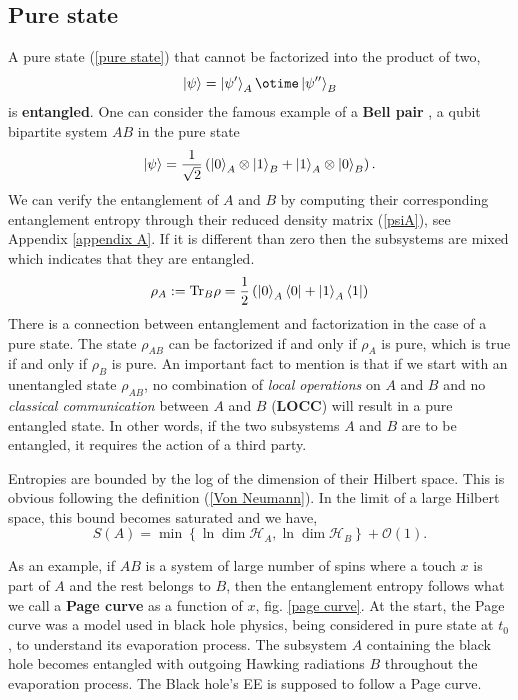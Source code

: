 \subsection{Pure state}
A pure state (\ref{pure state}) that cannot be factorized into the product of two,
\begin{equation}\label{factorized state}
    \ket{\psi} = \ket{\psi'}_A\otime\ket{\psi''}_B
\end{equation}
is \textbf{entangled}. One can consider the famous example of a \textbf{Bell pair} \cite{Bell}, a qubit bipartite system $AB$ in the pure state
\begin{equation}\label{Bell pair}
    \ket{\psi}=\frac{1}{\sqrt{2}}\left(\ket{0}_A\otimes\ket{1}_B+ \ket{1}_A\otimes\ket{0}_B\right).
\end{equation}
We can verify the entanglement of $A$ and $B$ by computing their corresponding entanglement entropy through their reduced density matrix (\ref{psiA}), see Appendix \ref{appendix A}. If it is different than zero then the subsystems are mixed which indicates that they are entangled.
\begin{equation}\label{psiA}
    \rho_A := \text{Tr}_B\rho = \frac{1}{2}\left(\ket{0}_A\bra{0}+\ket{1}_A\bra{1}\right)
\end{equation}
There is a connection between entanglement and factorization in the case of a pure state. The state $\rho_{AB}$ can be factorized if and only if $\rho_A$ is pure, which is true if and only if $\rho_B$ is pure. An important fact to mention is that if we start with an unentangled state $\rho_{AB}$, no combination of \textit{local operations} on $A$ and $B$ and no \textit{classical communication} between $A$ and $B$ (\textbf{LOCC})  will result in a pure entangled state. In other words, if the two subsystems $A$ and $B$ are to be entangled, it requires the action of a third party.

Entropies are bounded by the log of the dimension of their Hilbert space. This is obvious following the definition (\ref{Von Neumann}). In the limit of a large Hilbert space, this bound becomes saturated and we have,
\begin{equation}
    S\left(A\right) = \min \left\{ \ln\dim\mathcal{H}_A,\ln\dim\mathcal{H}_B\right\} + \mathcal{O}(1).
\end{equation}

As an example, if $AB$ is a system of large number of spins where a touch $x$ is part of $A$ and the rest belongs to $B$, then the entanglement entropy follows what we call a \textbf{Page curve} as a function of $x$, fig. \ref{page curve}. At the start, the Page curve was a model used in black hole physics, being considered in pure state at $t_0$, to understand its evaporation process. The subsystem $A$ containing the black hole becomes entangled with outgoing Hawking radiations $B$ throughout the evaporation process. The Black hole's EE is supposed to follow a Page curve.


